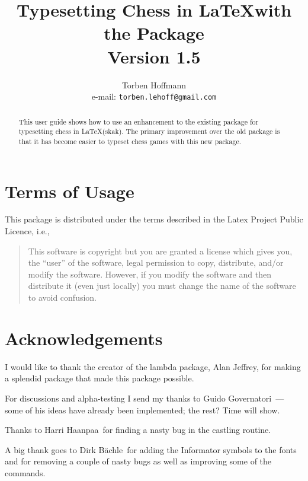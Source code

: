 \documentclass[10pt]{article}
\title{Typesetting Chess in \LaTeX with the \package{skak} Package\\
Version 1.5}
\author{Torben Hoffmann\\ e-mail: \texttt{torben.lehoff@gmail.com}}
\newcommand{\package}[1]{\textsf{#1}}
\newcommand{\Guido}{Guido Governatori\ }
\newcommand{\Harri}{Harri Haanpaa\ }
\newcommand{\Dirk}{Dirk B\"achle\ }
\begin{document}
\maketitle

\begin{abstract}
  This user guide shows how to use an enhancement to the existing
  package for typesetting chess in \LaTeX (\package{skak}). The
  primary improvement over the old package is that it has become
  easier to typeset chess games with this new package.
\end{abstract}

\newpage
\tableofcontents
\newpage



\section{Terms of Usage}
\label{sec:terms-usage}

This package is distributed under the terms described in the Latex
Project Public Licence, i.e.,

\begin{quote}
  This software is copyright but you are granted a license which gives
  you, the ``user'' of the software, legal permission to copy,
  distribute, and/or modify the software. However, if you modify the
  software and then distribute it (even just locally) you must change
  the name of the software to avoid confusion.
\end{quote}

\section{Acknowledgements}
\label{sec:acknowledgements}

I would like to thank the creator of the \package{lambda} package,
Alan Jeffrey, for making a splendid package that made this package
possible.

For discussions and alpha-testing I send my thanks to \Guido --- some
of his ideas have already been implemented; the rest? Time will show.

Thanks to \Harri for finding a nasty bug in the castling routine.

A big thank goes to \Dirk for adding the Informator symbols to the
fonts and for removing a couple of nasty bugs as well as improving
some of the commands.
\end{document}
